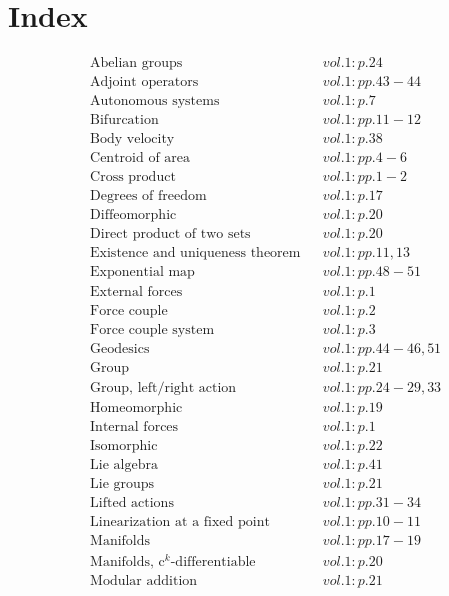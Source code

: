 \documentclass[a4paper]{article}
\begin{document}
 
\section*{Index} 
\begin{align*} 
&\text{Abelian groups}&& vol. 1: p. 24\\
&\text{Adjoint operators}&& vol. 1: pp. 43-44\\
&\text{Autonomous systems}&& vol. 1: p. 7\\
&\text{Bifurcation}&& vol. 1: pp. 11-12\\
&\text{Body velocity}&& vol. 1: p. 38\\
&\text{Centroid of area}&& vol. 1: pp. 4-6\\
&\text{Cross product}&& vol. 1: pp. 1-2\\
&\text{Degrees of freedom}&& vol. 1: p. 17\\
&\text{Diffeomorphic}&& vol. 1: p. 20\\
&\text{Direct product of two sets}&& vol. 1: p. 20\\
&\text{Existence and uniqueness theorem}&& vol. 1: pp. 11, 13\\
&\text{Exponential map}&& vol. 1: pp. 48-51\\
&\text{External forces}&& vol. 1: p. 1\\
&\text{Force couple}&& vol. 1: p. 2\\
&\text{Force couple system}&& vol. 1: p. 3\\
&\text{Geodesics}&& vol. 1: pp. 44-46, 51\\
&\text{Group}&& vol. 1: p. 21\\
&\text{Group, left/right action}&& vol. 1: pp. 24-29, 33\\
&\text{Homeomorphic}&& vol. 1: p. 19\\
&\text{Internal forces}&& vol. 1: p. 1\\
&\text{Isomorphic}&& vol. 1: p. 22\\
&\text{Lie algebra}&& vol. 1: p. 41\\
&\text{Lie groups}&& vol. 1: p. 21\\
&\text{Lifted actions}&& vol. 1: pp. 31-34\\
&\text{Linearization at a fixed point}&& vol. 1: pp. 10-11\\
&\text{Manifolds}&& vol. 1: pp. 17-19\\
&\text{Manifolds, c$^k$-differentiable}&& vol. 1: p. 20\\
&\text{Modular addition}&& vol. 1: p. 21\\

\end{align*}
\end{document}
